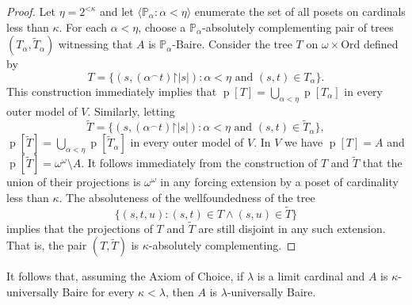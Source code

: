 \documentclass[fleqn, 11pt]{amsart}
\theoremstyle{plain}
\theoremstyle{definition}
\theoremstyle{remark}
\newcommand{\Ord}{\mathrm{Ord}}
\newcommand{\restrict}{\mathord{\restriction}}
\DeclareMathOperator{\p}{p}
\begin{document}
\begin{proof}
Let $\eta = 2^{\mathord{<}\kappa}$ and
let
$\langle \mathbb{P}_\alpha : \alpha < \eta\rangle $ enumerate the set of all posets on
cardinals less than $\kappa$.
For each $\alpha < \eta$, choose a $\mathbb{P}_\alpha$-absolutely complementing pair of trees $(T_\alpha, \tilde{T}_\alpha)$ witnessing that $A$ is $\mathbb{P}_\alpha$-Baire.
Consider the  tree $T$ on $\omega \times \Ord$ defined by
\[T = \{ (s, (\alpha^\frown t) \restrict \left|s\right|) : \alpha < \eta \text{ and } (s,t) \in T_\alpha \}.\]
This construction immediately implies that $\p[T] = \bigcup_{\alpha < \eta} \p[T_\alpha]$ in every outer model of $V$.
Similarly, letting 
\[\tilde{T} = \{ (s, (\alpha^\frown t) \restrict \left|s\right|) : \alpha < \eta \text{ and } (s,t) \in \tilde{T}_\alpha \},\]
$\p[\tilde{T}] = \bigcup_{\alpha < \eta} \p[\tilde{T}_\alpha]$ in every outer model of $V$.
In $V$ we have $\p[T] = A$ and $\p[\tilde{T}] = \omega^{\omega} \setminus A$. It follows immediately from the construction of $T$ and $\tilde{T}$ that the union of their projections is $\omega^{\omega}$ in any forcing extension by a poset of cardinality less than $\kappa$. The absoluteness of the wellfoundedness of the tree
\[\{ (s,t,u) : (s,t) \in T \wedge (s,u) \in \tilde{T}\}\] implies that the projections of $T$ and $\tilde{T}$ are still disjoint in any such extension. 
That is, the pair $(T, \tilde{T})$ is 
$\kappa$-absolutely complementing.
% 
% 
\end{proof}

It follows that, assuming the Axiom of Choice, if $\lambda$ is a limit cardinal and $A$ is $\kappa$-universally Baire for every $\kappa < \lambda$, then $A$ is $\lambda$-universally Baire.
\end{document}
